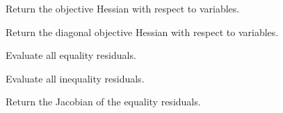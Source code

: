 \documentclass[letterpaper,10pt,english,openany,oneside]{sphinxmanual}
\begin{document}
\begin{fulllineitems}
\begin{fulllineitems}
\end{fulllineitems}



\begin{fulllineitems}

\pysigstartsignatures
{}
\pysigstopsignatures
\sphinxAtStartPar
Return the objective Hessian with respect to variables.

\end{fulllineitems}



\begin{fulllineitems}

\pysigstartsignatures
{}
\pysigstopsignatures
\sphinxAtStartPar
Return the diagonal objective Hessian with respect to variables.

\end{fulllineitems}



\begin{fulllineitems}

\pysigstartsignatures
{}
\pysigstopsignatures
\sphinxAtStartPar
Evaluate all equality residuals.

\end{fulllineitems}



\begin{fulllineitems}

\pysigstartsignatures
{}
\pysigstopsignatures
\sphinxAtStartPar
Evaluate all inequality residuals.

\end{fulllineitems}



\begin{fulllineitems}

\pysigstartsignatures
{}
\pysigstopsignatures
\sphinxAtStartPar
Return the Jacobian of the equality residuals.


\end{fulllineitems}
\end{fulllineitems}
\end{document}
